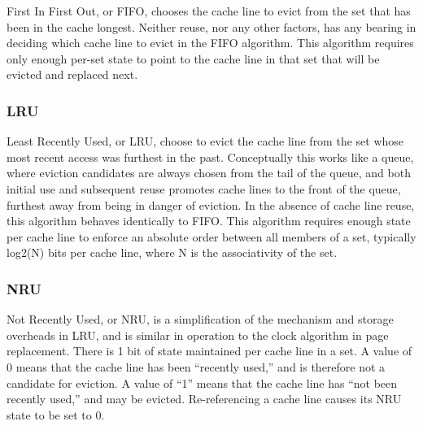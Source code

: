 First In First Out, or FIFO, chooses the cache line to evict from the set that has been in the cache longest.  Neither reuse, nor any other factors, has any bearing in deciding which cache line to evict in the FIFO algorithm.  This algorithm requires only enough per-set state to point to the cache line in that set that will be evicted and replaced next.
\subsubsection{LRU}

Least Recently Used, or LRU, choose to evict the cache line from the set whose most recent access was furthest in the past.  Conceptually this works like a queue, where eviction candidates are always chosen from the tail of the queue, and both initial use and subsequent reuse promotes cache lines to the front of the queue, furthest away from being in danger of eviction. In the absence of cache line reuse, this algorithm behaves identically to FIFO.  This algorithm requires enough state per cache line to enforce an absolute order between all members of a set, typically log2(N) bits per cache line, where N is the associativity of the set.

\subsubsection{NRU}

Not Recently Used, or NRU, is a simplification of the mechanism and storage overheads in LRU, and is similar in operation to the clock algorithm in page replacement.  There is 1 bit of state maintained per cache line in a set.  A value of 0 means that the cache line has been ``recently used,'' and is therefore not a candidate for eviction.  A value of ``1'' means that the cache line has ``not been recently used,'' and may be evicted.  Re-referencing a cache line causes its NRU state to be set to 0.

